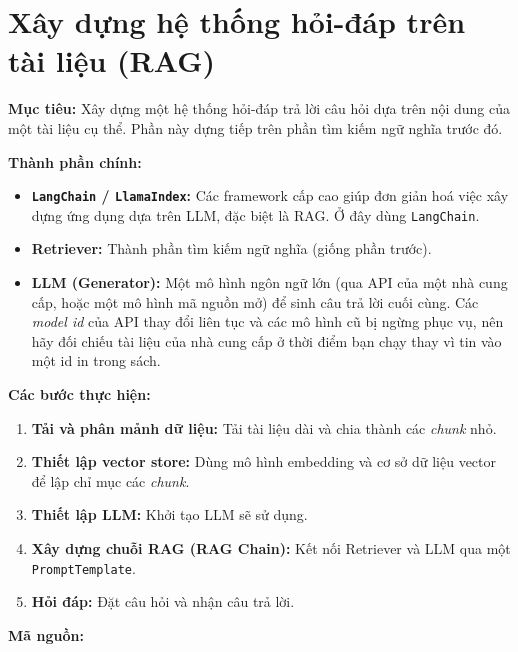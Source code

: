 
\section{Xây dựng hệ thống hỏi-đáp trên tài liệu (RAG)}
\label{sec:recipe_rag}

\textbf{Mục tiêu:} Xây dựng một hệ thống hỏi-đáp trả lời câu hỏi dựa trên nội dung của một tài liệu cụ thể. Phần này dựng tiếp trên phần tìm kiếm ngữ nghĩa trước đó.

\textbf{Thành phần chính:}
\begin{itemize}
    \item \textbf{\texttt{LangChain} / \texttt{LlamaIndex}:} Các framework cấp cao giúp đơn giản hoá việc xây dựng ứng dụng dựa trên LLM, đặc biệt là RAG. Ở đây dùng \texttt{LangChain}.
    \item \textbf{Retriever:} Thành phần tìm kiếm ngữ nghĩa (giống phần trước).
    \item \textbf{LLM (Generator):} Một mô hình ngôn ngữ lớn (qua API của một nhà cung cấp, hoặc một mô hình mã nguồn mở) để sinh câu trả lời cuối cùng. Các \textit{model id} của API thay đổi liên tục và các mô hình cũ bị ngừng phục vụ, nên hãy đối chiếu tài liệu của nhà cung cấp ở thời điểm bạn chạy thay vì tin vào một id in trong sách.
\end{itemize}

\textbf{Các bước thực hiện:}
\begin{enumerate}
    \item \textbf{Tải và phân mảnh dữ liệu:} Tải tài liệu dài và chia thành các \textit{chunk} nhỏ.
    \item \textbf{Thiết lập vector store:} Dùng mô hình embedding và cơ sở dữ liệu vector để lập chỉ mục các \textit{chunk}.
    \item \textbf{Thiết lập LLM:} Khởi tạo LLM sẽ sử dụng.
    \item \textbf{Xây dựng chuỗi RAG (RAG Chain):} Kết nối Retriever và LLM qua một \texttt{PromptTemplate}.
    \item \textbf{Hỏi đáp:} Đặt câu hỏi và nhận câu trả lời.
\end{enumerate}

\textbf{Mã nguồn:}

